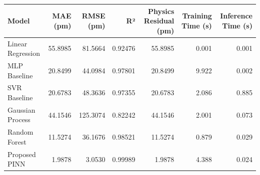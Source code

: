 \begin{tabular}{lrrrrrr}
\toprule
Model & MAE (pm) & RMSE (pm) & R² & Physics Residual (pm) & Training Time (s) & Inference Time (s) \\
\midrule
Linear Regression & 55.8985 & 81.5664 & 0.92476 & 55.8985 & 0.001 & 0.001 \\
MLP Baseline & 20.8499 & 44.0984 & 0.97801 & 20.8499 & 9.922 & 0.002 \\
SVR Baseline & 20.6783 & 48.3636 & 0.97355 & 20.6783 & 2.086 & 0.885 \\
Gaussian Process & 44.1546 & 125.3074 & 0.82242 & 44.1546 & 2.001 & 0.073 \\
Random Forest & 11.5274 & 36.1676 & 0.98521 & 11.5274 & 0.879 & 0.029 \\
Proposed PINN & 1.9878 & 3.0530 & 0.99989 & 1.9878 & 4.388 & 0.024 \\
\bottomrule
\end{tabular}
